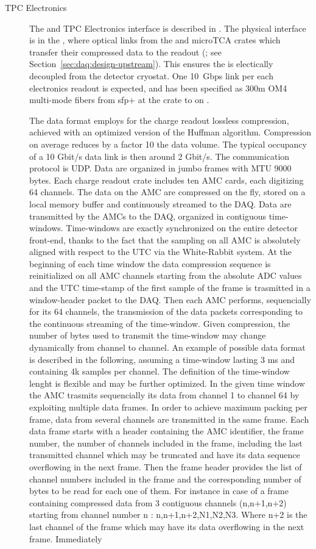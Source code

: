 \begin{description}
\item[TPC Electronics] The  and TPC Electronics interface is
  described in .
  The physical interface is in the , where optical links from the
   and  microTCA crates which transfer their compressed data to the
    readout (; see
  Section~\ref{sec:daq:design-upstream}).
  This ensures the  is electically decoupled from the detector
  cryostat.
  One \SI{10}{Gbps} link per each electronics readout is expected, and has been
  specified as 300m OM4 multi-mode fibers from sfp+ at the
    crate 
  to  on .

The data format employs for the charge readout lossless compression, achieved with an optimized version of the Huffman algorithm.  Compression on average reduces by a factor 10 the data volume.  The typical occupancy of a 10 Gbit/s data link is then around 2 Gbit/s. The communication protocol is UDP. Data are organized in jumbo frames with MTU 9000 bytes. Each charge readout crate includes ten AMC cards, each digitizing 64 channels. The data on the AMC are compressed on the fly, stored on a local memory buffer and continuously streamed to the DAQ.  Data are transmitted by the AMCs to the DAQ, organized in contiguous time-windows. Time-windows are exactly synchronized on the entire detector front-end, thanks to the fact  that the sampling on all AMC is absolutely aligned with respect to the UTC via the White-Rabbit system.  At the beginning of each time window the data compression sequence is reinitialized on all AMC channels starting from the absolute ADC values and the UTC time-stamp of the first sample of the frame is trasmitted in a window-header packet to the DAQ. Then each AMC performs, sequencially for its 64 channels, the transmission of the data packets corresponding to the continuous streaming of the  time-window. Given compression, the number of bytes used to transmit the time-window may change dynamically from channel to channel. An example of possible data format is described in the following, assuming a time-window lasting 3 ms and containing 4k samples per channel. The definition of the time-window lenght is flexible and may be further optimized.  In the given time window the AMC trasmits sequencially its data from channel 1 to channel 64 by exploiting multiple data frames. In order to achieve maximum packing per frame, data from several channels are transmitted in the same frame.  Each data frame starts with a header containing the AMC identifier, the frame number, the number of channels included in the frame, including the last transmitted channel  which may be truncated and have its data sequence overflowing in the next frame. Then the frame header provides the list of channel numbers included in the frame and the corresponding number of bytes to be read for each one of them.  For instance in case of a frame containing compressed data from 3 contiguous channels  (n,n+1,n+2) starting from channel number n : n,n+1,n+2,N1,N2,N3.  Where n+2 is the last channel of the frame which may have its data overflowing in the next frame. Immediately 
\end{description}
